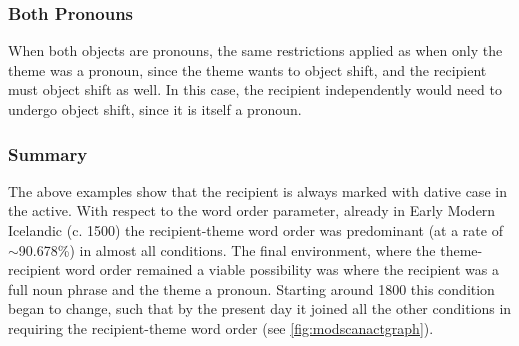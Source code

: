 \subsubsection{Both Pronouns}
When both objects are pronouns, the same restrictions applied as when only the theme was a pronoun, since the theme wants to object shift, and the recipient must object shift as well. In this case, the recipient independently would need to undergo object shift, since it is itself a pronoun.
\begin{exe}
\ex \cite[ex 50]{Vikner.1989}
\begin{xlist}
\end{xlist}
\end{exe}
\subsubsection{Summary}
The above examples show that the recipient is always marked with dative case in the active. With respect to the word order parameter, already in Early Modern Icelandic (c. 1500) the recipient-theme word order was predominant (at a rate of $\sim$90.678\%) in almost all conditions. The final environment, where the theme-recipient word order remained a viable possibility was where the recipient was a full noun phrase and the theme a pronoun. Starting around 1800 this condition began to change, such that by the present day it joined all the other conditions in requiring the recipient-theme word order (see \ref{fig:modscanactgraph}).

